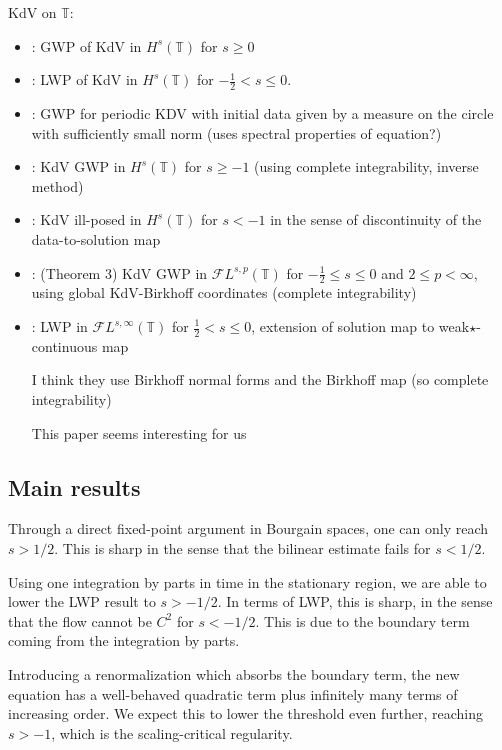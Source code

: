 \documentclass[a4paper, 11pt]{amsart}
\newcommand{\T}{\mathbb{T}}
\theoremstyle{plain}
\theoremstyle{definition}
\theoremstyle{remark}
\newcommand{\5}{\text{V}}
\newcommand{\FL}{\mathcal{F} L}
\numberwithin{equation}{section}
\theoremstyle{mytheoremstyle} \newtheorem{nota}[thm]{Remark}
\theoremstyle{mytheoremstyle} \newtheorem{exemplo}[thm]{Example}
\newcommand{\blue}{\color{blue}}
\begin{document}
KdV on $\T$:


\begin{itemize}

\item \cite{B93}: GWP of KdV in $H^s(\T)$ for $s\ge 0$

\item \cite{KPV96}: LWP of KdV in $H^s(\T)$ for $-\frac12<s\le 0$.

\item \cite{B97}: GWP for periodic KDV with initial data given by a measure on the circle with sufficiently small norm (uses spectral properties of equation?)

\item \cite{KT06}: KdV GWP in $H^s(\T)$ for $s\ge -1$ (using complete integrability, inverse method)

\item \cite{Mol12}: KdV ill-posed in $H^s(\T)$ for $s<-1$ in the sense of discontinuity of the data-to-solution map

\item \cite{KMMT16}: (Theorem 3) KdV GWP in $\FL^{s,p}(\T)$ for $-\frac12 \le s \le 0$ and $2\le p <\infty$, using global KdV-Birkhoff coordinates (complete integrability)


\item \cite{KM18}: LWP in $\FL^{s, \infty}(\T)$ for $\frac12<s\le0$, extension of solution map to weak$\star$-continuous map 

I think they use Birkhoff normal forms and the Birkhoff map (so complete integrability)

{\blue This paper seems interesting for us}
\end{itemize}




\subsection{Main results}

Through a direct fixed-point argument in Bourgain spaces, one can only reach $s>1/2$. This is sharp in the sense that the bilinear estimate fails for $s<1/2$.

Using one integration by parts in time in the stationary region, we are able to lower the LWP result to $s>-1/2$. In terms of LWP, this is sharp, in the sense that the flow cannot be $C^2$ for $s<-1/2$. This is due to the boundary term coming from the integration by parts.

Introducing a renormalization which absorbs the boundary term, the new equation has a well-behaved quadratic term plus infinitely many terms of increasing order. We expect this to lower the threshold even further, reaching $s>-1$, which is the scaling-critical regularity.
\end{document}
